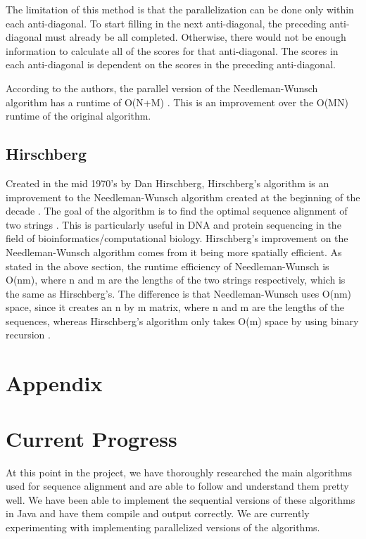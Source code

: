 \documentclass[conference]{IEEEtran}
\begin{document}
The limitation of this method is that the parallelization can be done only within each anti-diagonal. To start filling in the next anti-diagonal, the preceding anti-diagonal must already be all completed. Otherwise, there would not be enough information to calculate all of the scores for that anti-diagonal. The scores in each anti-diagonal is dependent on the scores in the preceding anti-diagonal.

According to the authors, the parallel version of the Needleman-Wunsch algorithm has a runtime of O(N+M) \cite{naveed_siddiqui_ahmed}. This is an improvement over the O(MN) runtime of the original algorithm.

\subsection{Hirschberg}

Created in the mid 1970’s by Dan Hirschberg, Hirschberg’s algorithm is an improvement to the Needleman-Wunsch algorithm created at the beginning of the decade \cite{hirschberg_1975}. The goal of the algorithm is to find the optimal sequence alignment of two strings \cite{hirschberg_1975}. This is particularly useful in DNA and protein sequencing in the field of bioinformatics/computational biology. Hirschberg’s improvement on the Needleman-Wunsch algorithm comes from it being more spatially efficient. As stated in the above section, the runtime efficiency of Needleman-Wunsch is O(nm), where n and m are the lengths of the two strings respectively, which is the same as Hirschberg’s. The difference is that Needleman-Wunsch uses O(nm) space, since it creates an n by m matrix, where n and m are the lengths of the sequences, whereas Hirschberg’s algorithm only takes O(m) space by using binary recursion \cite{edit_distance_revisited}.

\section*{Appendix}
\setcounter{section}{0}

\section{Current Progress}
At this point in the project, we have thoroughly researched the main algorithms used for sequence alignment and are able to follow and understand them pretty well. We have been able to implement the sequential versions of these algorithms in Java and have them compile and output correctly. We are currently experimenting with implementing parallelized versions of the algorithms.
 
\end{document}
